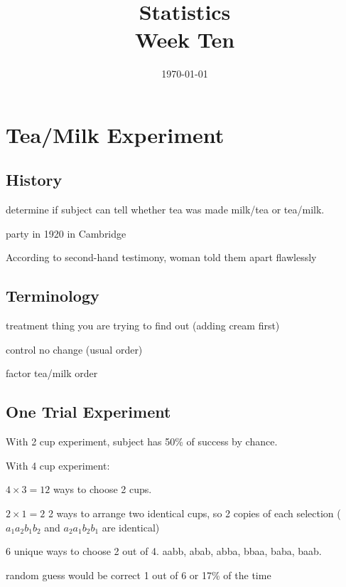 \documentclass[landscape]{exam}
\title{Statistics \\ Week Ten}
\date{\today}
\author{}
\begin{document}
  \maketitle
  \tableofcontents

  \section{Tea/Milk Experiment}

  \subsection{History}
  \begin{itemize*}
    \item determine if subject can tell whether tea was made milk/tea or tea/milk.

    \item party in 1920 in Cambridge

    \item According to second-hand testimony, woman told them apart flawlessly

  \end{itemize*}

  \subsection{Terminology}
  \begin{description*}
    \item[treatment] thing you are trying to find out (adding cream first)
    \item[control] no change (usual order)
    \item[factor] tea/milk order
  \end{description*}

  \subsection{One Trial Experiment}
  With 2 cup experiment, subject has 50\% of success by chance.

  With 4 cup experiment:
  \begin{itemize*}
    \item $4 \times 3 = 12$ ways to choose 2 cups.  

    \item $2 \times 1 = 2$ 2 ways to arrange two identical cups, so 2 copies of
      each selection ($a_1a_2b_1b_2$ and $a_2a_1b_2b_1$ are identical)

    \item 6 unique ways to choose 2 out of 4. aabb, abab, abba, bbaa,
      baba, baab.
    \item random guess would be correct 1 out of 6 or 17\% of the time
  \end{itemize*}
\end{document}
